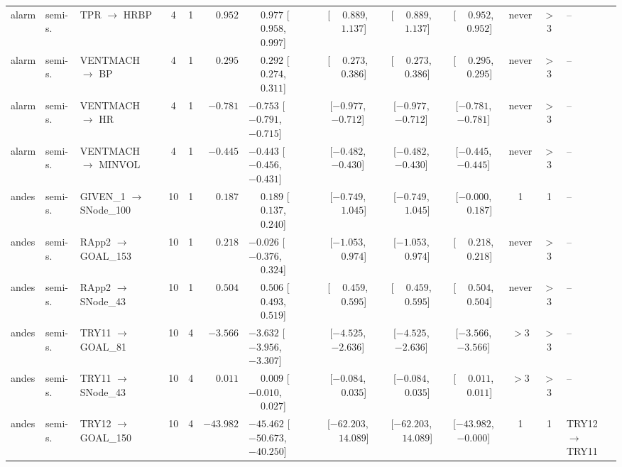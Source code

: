 \begin{landscape}
\begin{longtable}{@{}llp{2.15cm}ccrl cccc c l@{}}
alarm & semi-s. & TPR $\to$ HRBP & 4 & 1 & $\phantom{-}0.952$ & $\phantom{-}0.977$ [$\phantom{-}0.958$, $\phantom{-}0.997$] & [$\phantom{-}0.889$, $\phantom{-}1.137$] & [$\phantom{-}0.889$, $\phantom{-}1.137$] & [$\phantom{-}0.952$, $\phantom{-}0.952$] & never & $>$3 & -- \\
alarm & semi-s. & VENTMACH $\to$ BP & 4 & 1 & $\phantom{-}0.295$ & $\phantom{-}0.292$ [$\phantom{-}0.274$, $\phantom{-}0.311$] & [$\phantom{-}0.273$, $\phantom{-}0.386$] & [$\phantom{-}0.273$, $\phantom{-}0.386$] & [$\phantom{-}0.295$, $\phantom{-}0.295$] & never & $>$3 & -- \\
alarm & semi-s. & VENTMACH $\to$ HR & 4 & 1 & $-0.781$ & $-0.753$ [$-0.791$, $-0.715$] & [$-0.977$, $-0.712$] & [$-0.977$, $-0.712$] & [$-0.781$, $-0.781$] & never & $>$3 & -- \\
alarm & semi-s. & VENTMACH $\to$ MINVOL & 4 & 1 & $-0.445$ & $-0.443$ [$-0.456$, $-0.431$] & [$-0.482$, $-0.430$] & [$-0.482$, $-0.430$] & [$-0.445$, $-0.445$] & never & $>$3 & -- \\
andes & semi-s. & GIVEN\_\allowbreak{}1 $\to$ SNode\_\allowbreak{}100 & 10 & 1 & $\phantom{-}0.187$ & $\phantom{-}0.189$ [$\phantom{-}0.137$, $\phantom{-}0.240$] & [$-0.749$, $\phantom{-}1.045$] & [$-0.749$, $\phantom{-}1.045$] & [$-0.000$, $\phantom{-}0.187$] & 1 & 1 & -- \\
andes & semi-s. & RApp2 $\to$ GOAL\_\allowbreak{}153 & 10 & 1 & $\phantom{-}0.218$ & $-0.026$ [$-0.376$, $\phantom{-}0.324$] & [$-1.053$, $\phantom{-}0.974$] & [$-1.053$, $\phantom{-}0.974$] & [$\phantom{-}0.218$, $\phantom{-}0.218$] & never & $>$3 & -- \\
andes & semi-s. & RApp2 $\to$ SNode\_\allowbreak{}43 & 10 & 1 & $\phantom{-}0.504$ & $\phantom{-}0.506$ [$\phantom{-}0.493$, $\phantom{-}0.519$] & [$\phantom{-}0.459$, $\phantom{-}0.595$] & [$\phantom{-}0.459$, $\phantom{-}0.595$] & [$\phantom{-}0.504$, $\phantom{-}0.504$] & never & $>$3 & -- \\
andes & semi-s. & TRY11 $\to$ GOAL\_\allowbreak{}81 & 10 & 4 & $-3.566$ & $-3.632$ [$-3.956$, $-3.307$] & [$-4.525$, $-2.636$] & [$-4.525$, $-2.636$] & [$-3.566$, $-3.566$] & $>$3 & $>$3 & -- \\
andes & semi-s. & TRY11 $\to$ SNode\_\allowbreak{}43 & 10 & 4 & $\phantom{-}0.011$ & $\phantom{-}0.009$ [$-0.010$, $\phantom{-}0.027$] & [$-0.084$, $\phantom{-}0.035$] & [$-0.084$, $\phantom{-}0.035$] & [$\phantom{-}0.011$, $\phantom{-}0.011$] & $>$3 & $>$3 & -- \\
andes & semi-s. & TRY12 $\to$ GOAL\_\allowbreak{}150 & 10 & 4 & $-43.982$ & $-45.462$ [$-50.673$, $-40.250$] & [$-62.203$, $\phantom{-}14.089$] & [$-62.203$, $\phantom{-}14.089$] & [$-43.982$, $-0.000$] & 1 & 1 & TRY12$\to$TRY11 \\

\end{longtable}
\end{landscape}
